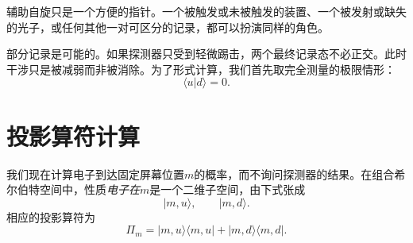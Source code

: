 \begin{classroomqa}
\end{classroomqa}

辅助自旋只是一个方便的指针。一个被触发或未被触发的装置、一个被发射或缺失的光子，或任何其他一对可区分的记录，都可以扮演同样的角色。

\begin{classroomqa}
\end{classroomqa}

\begin{classroomqa}
\end{classroomqa}

部分记录是可能的。如果探测器只受到轻微踢击，两个最终记录态不必正交。此时干涉只是被减弱而非被消除。为了形式计算，我们首先取完全测量的极限情形：
\begin{equation}
\langle u|d\rangle=0.
\end{equation}

\section{投影算符计算}

我们现在计算电子到达固定屏幕位置\(m\)的概率，而不询问探测器的结果。在组合希尔伯特空间中，性质\emph{电子在\(m\)}是一个二维子空间，由下式张成
\begin{equation}
|m,u\rangle,\qquad |m,d\rangle.
\end{equation}
相应的投影算符为
\begin{equation}
\Pi_m
=|m,u\rangle\langle m,u|
 +|m,d\rangle\langle m,d|.
\end{equation}


